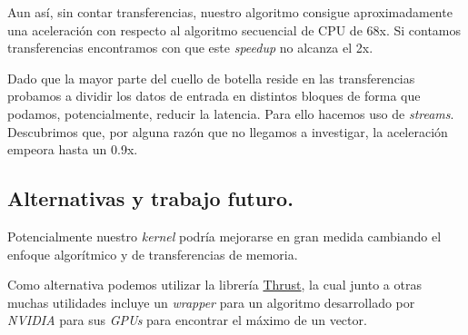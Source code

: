Aun así, sin contar transferencias, nuestro algoritmo consigue aproximadamente una aceleración con respecto al algoritmo secuencial de CPU
de 68x. Si contamos transferencias encontramos con que este \textit{speedup} no alcanza el 2x.

Dado que la mayor parte del cuello de botella reside en las transferencias probamos a dividir los datos de entrada en distintos
bloques de forma que podamos, potencialmente, reducir la latencia. Para ello hacemos uso de \textit{streams}.
Descubrimos que, por alguna razón que no llegamos a investigar, la aceleración empeora hasta un 0.9x.

\subsection{Alternativas y trabajo futuro.}

Potencialmente nuestro \textit{kernel} podría mejorarse en gran medida cambiando el enfoque algorítmico y de transferencias de memoria.

Como alternativa podemos utilizar la librería \href{https://github.com/NVIDIA/thrust}{Thrust}, la cual junto a otras muchas utilidades
incluye un \textit{wrapper} para un algoritmo desarrollado por \textit{NVIDIA} para sus \textit{GPUs} para encontrar el máximo de un vector.
